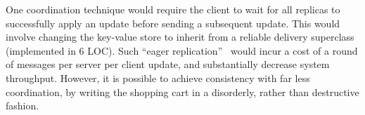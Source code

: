 One coordination technique would require the client to wait for all replicas to
successfully apply an update before sending a subsequent update.  This would
involve changing the key-value store to inherit from a reliable delivery
superclass (implemented in 6 LOC).
Such ``eager replication''~\cite{dangers} would incur a cost of a round of
messages per server per client update, and substantially decrease system
throughput.  However, it is possible to achieve consistency with far less
coordination, by writing the shopping cart in a disorderly, rather than
destructive fashion.

